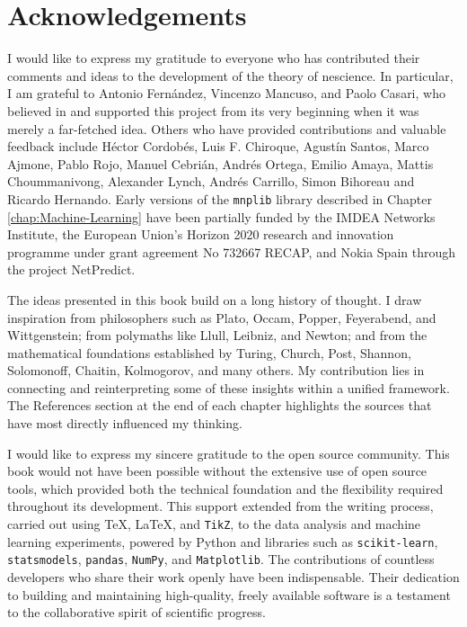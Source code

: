 %
%

\section*{Acknowledgements}

I would like to express my gratitude to everyone who has contributed their comments and ideas to the development of the theory of nescience. In particular, I am grateful to Antonio Fernández, Vincenzo Mancuso, and Paolo Casari, who believed in and supported this project from its very beginning when it was merely a far-fetched idea. Others who have provided contributions and valuable feedback include Héctor Cordobés, Luis F. Chiroque, Agustín Santos, Marco Ajmone, Pablo Rojo, Manuel Cebrián, Andrés Ortega, Emilio Amaya, Mattis Choummanivong, Alexander Lynch, Andrés Carrillo, Simon Bihoreau and Ricardo Hernando. Early versions of the \texttt{mnplib} library described in Chapter \ref{chap:Machine-Learning} have been partially funded by the IMDEA Networks Institute, the European Union's Horizon 2020 research and innovation programme under grant agreement No 732667 RECAP, and Nokia Spain through the project NetPredict.

The ideas presented in this book build on a long history of thought. I draw inspiration from philosophers such as Plato, Occam, Popper, Feyerabend, and Wittgenstein; from polymaths like Llull, Leibniz, and Newton; and from the mathematical foundations established by Turing, Church, Post, Shannon, Solomonoff, Chaitin, Kolmogorov, and many others. My contribution lies in connecting and reinterpreting some of these insights within a unified framework. 
The References section at the end of each chapter highlights the sources that have most directly influenced my thinking.

I would like to express my sincere gratitude to the open source community. This book would not have been possible without the extensive use of open source tools, which provided both the technical foundation and the flexibility required throughout its development. This support extended from the writing process, carried out using \TeX{}, \LaTeX{}, and \texttt{TikZ}, to the data analysis and machine learning experiments, powered by Python and libraries such as \texttt{scikit-learn}, \texttt{statsmodels}, \texttt{pandas}, \texttt{NumPy}, and \texttt{Matplotlib}. The contributions of countless developers who share their work openly have been indispensable. Their dedication to building and maintaining high-quality, freely available software is a testament to the collaborative spirit of scientific progress.

